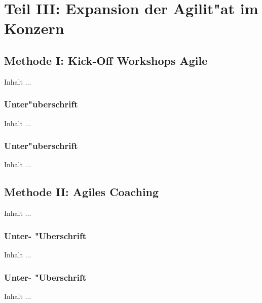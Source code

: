 
\chapter{Teil III: Expansion der Agilit"at im Konzern}
\minitoc 
\vspace{1 cm} 

\section{Methode I: Kick-Off Workshops Agile}
Inhalt ...

\subsection{Unter"uberschrift}
Inhalt ...

\subsection{Unter"uberschrift}
Inhalt ...


\section{Methode II: Agiles Coaching}
Inhalt ...

\subsection{Unter- "Uberschrift}
Inhalt ...

\subsection{Unter- "Uberschrift}
Inhalt ...
